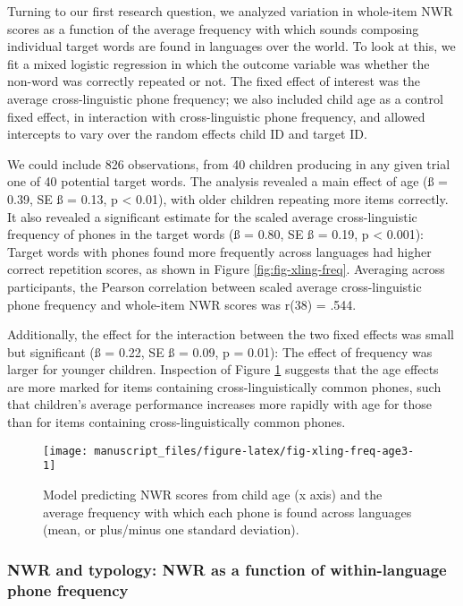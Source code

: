 \documentclass[
  english,
  ,man,floatsintext]{apa6}
\begin{document}
Turning to our first research question, we analyzed variation in whole-item NWR scores as a function of the average frequency with which sounds composing individual target words are found in languages over the world. To look at this, we fit a mixed logistic regression in which the outcome variable was whether the non-word was correctly repeated or not. The fixed effect of interest was the average cross-linguistic phone frequency; we also included child age as a control fixed effect, in interaction with cross-linguistic phone frequency, and allowed intercepts to vary over the random effects child ID and target ID.

We could include 826 observations, from 40 children producing in any given trial one of 40 potential target words. The analysis revealed a main effect of age (ß = 0.39, SE ß = 0.13, p \textless{} 0.01), with older children repeating more items correctly. It also revealed a significant estimate for the scaled average cross-linguistic frequency of phones in the target words (ß = 0.80, SE ß = 0.19, p \textless{} 0.001): Target words with phones found more frequently across languages had higher correct repetition scores, as shown in Figure \ref{fig:fig-xling-freq}. Averaging across participants, the Pearson correlation between scaled average cross-linguistic phone frequency and whole-item NWR scores was r(38) = .544.

Additionally, the effect for the interaction between the two fixed effects was small but significant (ß = 0.22, SE ß = 0.09, p = 0.01): The effect of frequency was larger for younger children. Inspection of Figure \ref{fig:fig-xling-freq-age3} suggests that the age effects are more marked for items containing cross-linguistically common phones, such that children's average performance increases more rapidly with age for those than for items containing cross-linguistically common phones.

\begin{figure}[!t]

{\centering \texttt{[image: manuscript\_files/figure-latex/fig-xling-freq-age3-1]} 

}

\caption{Model predicting NWR scores from child age (x axis) and the average frequency with which each phone is found across languages (mean, or plus/minus one standard deviation).}\label{fig:fig-xling-freq-age3}
\end{figure}

\hypertarget{nwr-and-typology-nwr-as-a-function-of-within-language-phone-frequency}{%
\subsubsection{NWR and typology: NWR as a function of within-language phone frequency}\label{nwr-and-typology-nwr-as-a-function-of-within-language-phone-frequency}}
\end{document}
